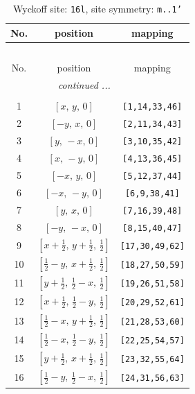 \documentclass[fleqn,8pt]{jsarticle}
\begin{document}
\renewcommand{\arraystretch}{1.2}
\begin{longtable}{ccc}
\caption{Wyckoff site: {\tt 16l}, site symmetry: {\tt m..1'}}
 \\
 \hline \hline
No. & position & mapping \\ \hline \endfirsthead

\multicolumn{2}{l}{\tablename\ \thetable{}} \\
 \hline \hline
No. & position & mapping \\ \hline \endhead

 \hline \hline
\multicolumn{2}{r}{\footnotesize\it continued ...} \\ \endfoot

 \hline \hline
\multicolumn{2}{r}{} \\ \endlastfoot

1 & $\left[ x,\, y,\, 0 \right]$ & {\tt [1,14,33,46]} \\ \hline
2 & $\left[ - y,\, x,\, 0 \right]$ & {\tt [2,11,34,43]} \\ \hline
3 & $\left[ y,\, - x,\, 0 \right]$ & {\tt [3,10,35,42]} \\ \hline
4 & $\left[ x,\, - y,\, 0 \right]$ & {\tt [4,13,36,45]} \\ \hline
5 & $\left[ - x,\, y,\, 0 \right]$ & {\tt [5,12,37,44]} \\ \hline
6 & $\left[ - x,\, - y,\, 0 \right]$ & {\tt [6,9,38,41]} \\ \hline
7 & $\left[ y,\, x,\, 0 \right]$ & {\tt [7,16,39,48]} \\ \hline
8 & $\left[ - y,\, - x,\, 0 \right]$ & {\tt [8,15,40,47]} \\ \hline
9 & $\left[ x + \frac{1}{2},\, y + \frac{1}{2},\, \frac{1}{2} \right]$ & {\tt [17,30,49,62]} \\ \hline
10 & $\left[ \frac{1}{2} - y,\, x + \frac{1}{2},\, \frac{1}{2} \right]$ & {\tt [18,27,50,59]} \\ \hline
11 & $\left[ y + \frac{1}{2},\, \frac{1}{2} - x,\, \frac{1}{2} \right]$ & {\tt [19,26,51,58]} \\ \hline
12 & $\left[ x + \frac{1}{2},\, \frac{1}{2} - y,\, \frac{1}{2} \right]$ & {\tt [20,29,52,61]} \\ \hline
13 & $\left[ \frac{1}{2} - x,\, y + \frac{1}{2},\, \frac{1}{2} \right]$ & {\tt [21,28,53,60]} \\ \hline
14 & $\left[ \frac{1}{2} - x,\, \frac{1}{2} - y,\, \frac{1}{2} \right]$ & {\tt [22,25,54,57]} \\ \hline
15 & $\left[ y + \frac{1}{2},\, x + \frac{1}{2},\, \frac{1}{2} \right]$ & {\tt [23,32,55,64]} \\ \hline
16 & $\left[ \frac{1}{2} - y,\, \frac{1}{2} - x,\, \frac{1}{2} \right]$ & {\tt [24,31,56,63]} \\
\end{longtable}
\end{document}
